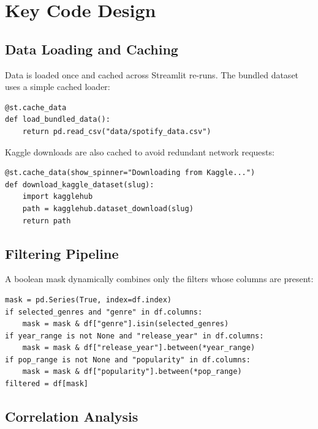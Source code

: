 \documentclass[12pt,a4paper]{article}
\begin{document}
\section{Key Code Design}

\subsection{Data Loading and Caching}

Data is loaded once and cached across Streamlit re-runs. The bundled dataset uses a simple cached loader:

\begin{lstlisting}[style=pythonstyle, caption={Cached data loading}]
@st.cache_data
def load_bundled_data():
    return pd.read_csv("data/spotify_data.csv")
\end{lstlisting}

Kaggle downloads are also cached to avoid redundant network requests:

\begin{lstlisting}[style=pythonstyle, caption={Cached Kaggle download}]
@st.cache_data(show_spinner="Downloading from Kaggle...")
def download_kaggle_dataset(slug):
    import kagglehub
    path = kagglehub.dataset_download(slug)
    return path
\end{lstlisting}

\subsection{Filtering Pipeline}

A boolean mask dynamically combines only the filters whose columns are present:

\begin{lstlisting}[style=pythonstyle, caption={Adaptive data filtering}]
mask = pd.Series(True, index=df.index)
if selected_genres and "genre" in df.columns:
    mask = mask & df["genre"].isin(selected_genres)
if year_range is not None and "release_year" in df.columns:
    mask = mask & df["release_year"].between(*year_range)
if pop_range is not None and "popularity" in df.columns:
    mask = mask & df["popularity"].between(*pop_range)
filtered = df[mask]
\end{lstlisting}

\subsection{Correlation Analysis}
\end{document}
